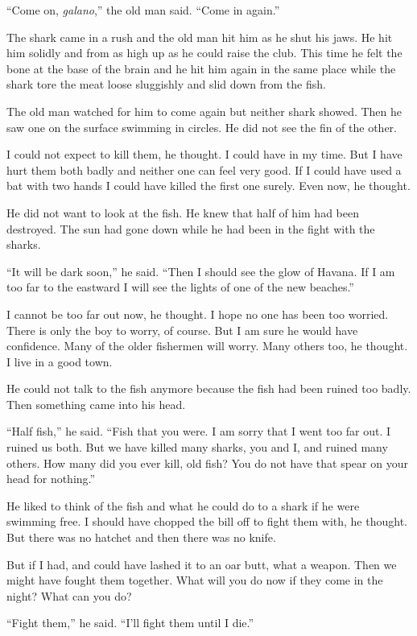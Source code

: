 \documentclass[fontset=ubuntu,zihao=-4]{ctexrep}
\begin{document}
``Come on, \emph{galano},'' the old man said. ``Come in again.''

The shark came in a rush and the old man hit him as he shut his jaws. He hit
him solidly and from as high up as he could raise the club. This time he
felt the bone at the base of the brain and he hit him again in the same
place while the shark tore the meat loose \gls{sluggishly} and slid down from the
fish.

The old man watched for him to come again but neither shark showed. Then he
saw one on the surface swimming in circles. He did not see the fin of the
other.

I could not expect to kill them, he thought. I could have in my time. But I
have hurt them both badly and neither one can feel very good. If I could
have used a bat with two hands I could have killed the first one surely.
Even now, he thought.

He did not want to look at the fish. He knew that half of him had been
destroyed. The sun had gone down while he had been in the fight with the
sharks.

``It will be dark soon,'' he said. ``Then I should see the glow of Havana.
If I am too far to the eastward I will see the lights of one of the new
beaches.''

I cannot be too far out now, he thought. I hope no one has been too worried.
There is only the boy to worry, of course. But I am sure he would have
\gls{confidence}. Many of the older fishermen will worry. Many others too,
he thought. I live in a good town.

He could not talk to the fish anymore because the fish had been \gls{ruined}
too badly. Then something came into his head.

``Half fish,'' he said. ``Fish that you were. I am sorry that I went too far
out. I ruined us both. But we have killed many sharks, you and I, and ruined
many others. How many did you ever kill, old fish? You do not have that
spear on your head for nothing.''

He liked to think of the fish and what he could do to a shark if he were
swimming free. I should have \gls{chopped} the bill off to fight them with,
he thought. But there was no \gls{hatchet} and then there was no knife.

But if I had, and could have lashed it to an oar butt, what a weapon.
Then we might have fought them together. What will you do now if they come
in the night? What can you do?

``Fight them,'' he said. ``I'll fight them until I die.''
\end{document}
